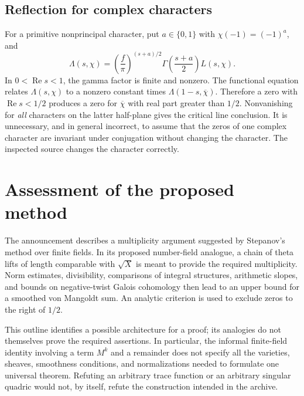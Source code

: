 \documentclass[11pt,a4paper]{article}
\theoremstyle{remark}
\DeclareMathOperator{\Rea}{Re}
\newcommand{\src}[1]{\cite{#1}}
\begin{document}
\subsection{Reflection for complex characters}
For a primitive nonprincipal character, put $a\in\{0,1\}$ with $\chi(-1)=(-1)^a$, and
\[
 \Lambda(s,\chi)=\left(\frac f\pi\right)^{(s+a)/2}
                  \Gamma\!\left(\frac{s+a}{2}\right)L(s,\chi).
\]
In $0<\Rea s<1$, the gamma factor is finite and nonzero. The functional equation relates $\Lambda(s,\chi)$ to a nonzero constant times $\Lambda(1-s,\overline\chi)$. Therefore a zero with $\Rea s<1/2$ produces a zero for $\overline\chi$ with real part greater than $1/2$. Nonvanishing for \emph{all} characters on the latter half-plane gives the critical line conclusion. It is unnecessary, and in general incorrect, to assume that the zeros of one complex character are invariant under conjugation without changing the character. The inspected source changes the character correctly. \src{S-character}

\section{Assessment of the proposed method}
The announcement describes a multiplicity argument suggested by Stepanov's method over finite fields. In its proposed number-field analogue, a chain of theta lifts of length comparable with $\sqrt X$ is meant to provide the required multiplicity. Norm estimates, divisibility, comparisons of integral structures, arithmetic slopes, and bounds on negative-twist Galois cohomology then lead to an upper bound for a smoothed von Mangoldt sum. An analytic criterion is used to exclude zeros to the right of $1/2$. \src{announcement}

This outline identifies a possible architecture for a proof; its analogies do not themselves prove the required assertions. In particular, the informal finite-field identity involving a term $M^k$ and a remainder does not specify all the varieties, sheaves, smoothness conditions, and normalizations needed to formulate one universal theorem. Refuting an arbitrary trace function or an arbitrary singular quadric would not, by itself, refute the construction intended in the archive.
\end{document}
